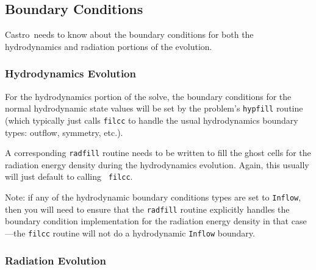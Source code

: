 \documentclass[11pt,letterpaper]{article}
\newcommand{\castro}{{\sf Castro}}
\begin{document}
\subsection{Boundary Conditions}

\castro\ needs to know about the boundary conditions for both
the hydrodynamics and radiation portions of the evolution.

\subsubsection{Hydrodynamics Evolution}

For the hydrodynamics portion of the solve, the boundary conditions
for the normal hydrodynamic state values will be set by the problem's
{\tt hypfill} routine (which typically just calls {\tt filcc} to handle
the usual hydrodynamics boundary types: outflow, symmetry, etc.).

A corresponding {\tt radfill} routine needs to be written to fill the
ghost cells for the radiation energy density during the hydrodynamics
evolution.  Again, this usually will just default to calling {\tt
  filcc}.

Note: if any of the hydrodynamic boundary conditions types are set
to {\tt Inflow}, then you will need to ensure that the {\tt radfill}
routine explicitly handles the boundary condition implementation
for the radiation energy density in that case---the {\tt filcc}
routine will not do a hydrodynamic {\tt Inflow} boundary.


\subsubsection{Radiation Evolution}
\end{document}
